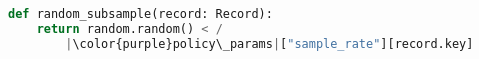 \begin{lstlisting}[language=Python, caption=Event load shedding example using scheduling parameters., escapechar={|}, label={lst:shedding}]
def random_subsample(record: Record): 
    return random.random() < /
        |\color{purple}policy\_params|["sample_rate"][record.key]
\end{lstlisting}